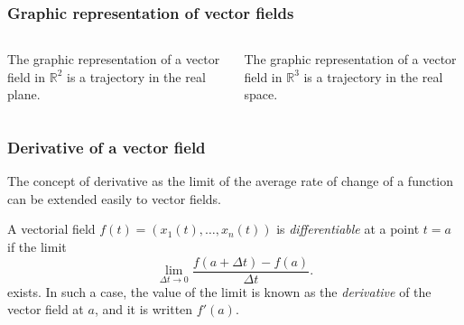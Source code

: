 \begin{frame}
\frametitle{Graphic representation of vector fields}

\begin{columns}
\begin{column}{0.5\textwidth}
The graphic representation of a vector field in $\mathbb{R}^2$ is a trajectory in the real plane.
\begin{center}

\end{center}
\end{column}
\begin{column}{0.5\textwidth}
The graphic representation of a vector field in $\mathbb{R}^3$ is a trajectory in the real space.
\begin{center}

\end{center}
\end{column}
\end{columns}
\end{frame}



\begin{frame}
\frametitle{Derivative of a vector field}
The concept of derivative as the limit of the average rate of change of a function can be extended easily to vector fields.

\begin{definition}
A vectorial field $f(t)=(x_1(t),\ldots,x_n(t))$ is \emph{differentiable} at a point $t=a$ if the limit
\[
\lim_{\Delta t\rightarrow 0} \frac{f(a+\Delta t)-f(a)}{\Delta t}.
\]
exists. 
In such a case, the value of the limit is known as the \emph{derivative} of the vector field at $a$, and it is written $f'(a)$.
\end{definition}
\end{frame}



